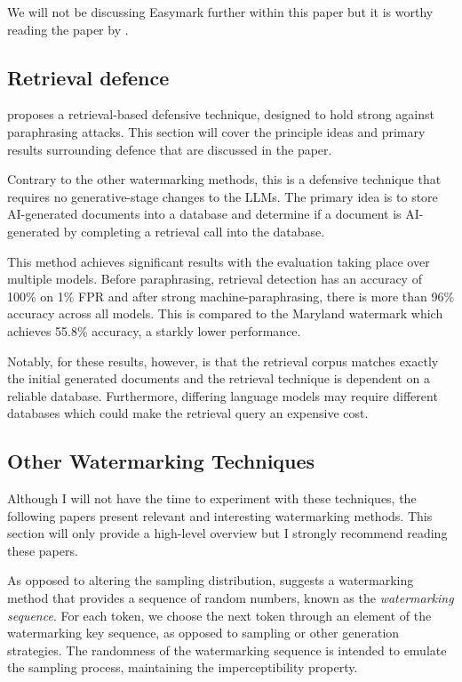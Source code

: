 \documentclass{l4proj}
\theoremstyle{definition}
\begin{document}
        We will not be discussing Easymark further within this paper but it is worthy reading the paper by \citet{sato2023embarrassingly}.
    \subsection{Retrieval defence}
        \citet{krishna2023paraphrasing} proposes a retrieval-based defensive technique, designed to hold strong against paraphrasing attacks. This section will cover the principle ideas and primary results surrounding defence that are discussed in the paper. 

        Contrary to the other watermarking methods, this is a defensive technique that requires no generative-stage changes to the LLMs. The primary idea is to store AI-generated documents into a database and determine if a document is AI-generated by completing a retrieval call into the database.

        This method achieves significant results with the evaluation taking place over multiple models. Before paraphrasing, retrieval detection has an accuracy of 100\% on 1\% FPR and after strong machine-paraphrasing, there is more than 96\% accuracy across all models. This is compared to the Maryland watermark which achieves 55.8\% accuracy, a starkly lower performance.
        
        Notably, for these results, however, is that the retrieval corpus matches exactly the initial generated documents and the retrieval technique is dependent on a reliable database. Furthermore, differing language models may require different databases which could make the retrieval query an expensive cost. 
        
    \subsection{Other Watermarking Techniques}
        \label{sec:other-watermarks}
        Although I will not have the time to experiment with these techniques, the following papers present relevant and interesting watermarking methods. This section will only provide a high-level overview but I strongly recommend reading these papers.

        As opposed to altering the sampling distribution, \citet{kuditipudi2023robust} suggests a watermarking method that provides a sequence of random numbers, known as the \emph{watermarking sequence}. For each token, we choose the next token through an element of the watermarking key sequence, as opposed to sampling or other generation strategies. The randomness of the watermarking sequence is intended to emulate the sampling process, maintaining the imperceptibility property. 
\end{document}
